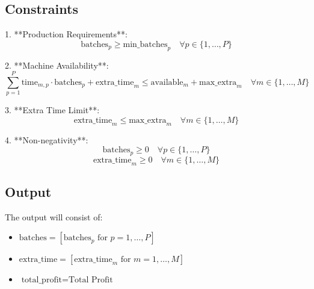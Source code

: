\documentclass{article}
\begin{document}
\subsection*{Constraints}
1. **Production Requirements**:
   \[
   \text{batches}_p \geq \text{min\_batches}_p \quad \forall p \in \{1, \ldots, P\}
   \]

2. **Machine Availability**:
   \[
   \sum_{p=1}^{P} \text{time}_{m,p} \cdot \text{batches}_p + \text{extra\_time}_m \leq \text{available}_m + \text{max\_extra}_m \quad \forall m \in \{1, \ldots, M\}
   \]

3. **Extra Time Limit**:
   \[
   \text{extra\_time}_m \leq \text{max\_extra}_m \quad \forall m \in \{1, \ldots, M\}
   \]

4. **Non-negativity**:
   \[
   \text{batches}_p \geq 0 \quad \forall p \in \{1, \ldots, P\}
   \]
   \[
   \text{extra\_time}_m \geq 0 \quad \forall m \in \{1, \ldots, M\}
   \]

\subsection*{Output}
The output will consist of:
\begin{itemize}
    \item \( \text{batches} = [\text{batches}_p \text{ for } p = 1, \ldots, P] \)
    \item \( \text{extra\_time} = [\text{extra\_time}_m \text{ for } m = 1, \ldots, M] \)
    \item \( \text{total\_profit} = \text{Total Profit} \)
\end{itemize}
\end{document}
